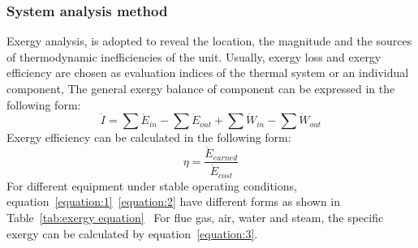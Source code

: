 \documentclass[preprint,12pt]{elsarticle}
\begin{document}
\subsubsection{System analysis method} %
\label{ssub3:analsys method} 
Exergy analysis, is adopted to reveal the location, the magnitude and the sources of thermodynamic inefficiencies of the unit.
Usually, exergy loss and exergy efficiency are chosen as evaluation indices of the thermal system or an individual component, 
The general exergy balance of component can be expressed in the following form:
\begin{equation}
\label{equation:1}
\dot{I}=\sum\dot{E}{}_{in}-\sum\dot{E}{}_{out}+\sum\dot{W}{}_{in}-\sum\dot{W}{}_{out}
\end{equation}
Exergy efficiency can be calculated in the following form:
\begin{equation}
\label{equation:2}
\eta=\frac{\dot{E}{}_{earned}}{\dot{E}{}_{cost}}
\end{equation}
For different equipment under stable operating conditions, equation~\ref{equation:1}~\ref{equation:2} have different forms as shown in Table~\ref{tab:exergy equation}~\cite{Aljundi2009Energy}
For flue gas, air, water and steam, the specific exergy can be calculated by equation~\ref{equation:3}.
\end{document}
